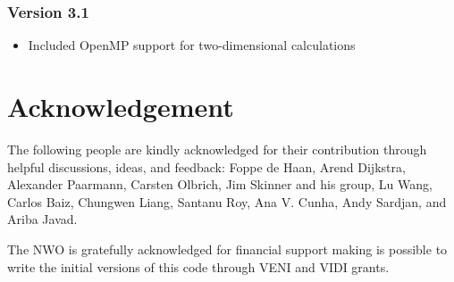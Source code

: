 \documentclass[12pt]{book}
\begin{document}
\subsection{Version 3.1}
\begin{itemize}
\item Included OpenMP support for two-dimensional calculations
\end{itemize}









\chapter{Acknowledgement}
The following people are kindly acknowledged for their contribution through helpful discussions, ideas, and feedback:
Foppe de Haan, Arend Dijkstra, Alexander Paarmann, Carsten Olbrich, Jim Skinner and his group, Lu Wang, Carlos Baiz, Chungwen Liang, Santanu Roy, Ana V. Cunha, Andy Sardjan, and Ariba Javad. 

The NWO is gratefully acknowledged
for financial support making is possible to write the initial versions of this code through VENI and VIDI grants. 


\end{document}

